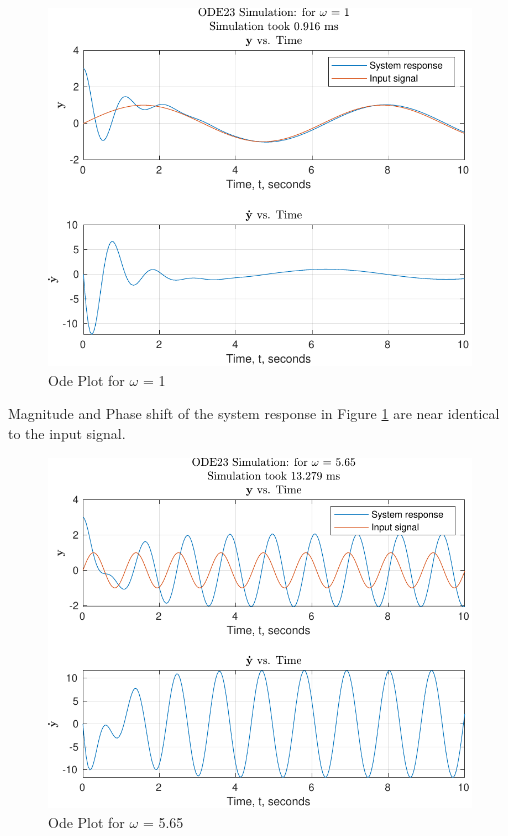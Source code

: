 \documentclass[12pt]{article}
\begin{document}
			
		\begin{figure}[H]
			\centering
			\includegraphics[width=1\linewidth]{Code/Fig/ode_sin_input_1}
			\caption{Ode Plot for $\omega$ = 1}
			\label{fig:odesininput1}
		\end{figure}
		Magnitude and Phase shift of the system response in Figure \ref{fig:odesininput1} are near identical to the input signal.
		\begin{figure}[H]
			\centering
			\includegraphics[width=1\linewidth]{Code/Fig/ode_sin_input_5.65}
			\caption{Ode Plot for $\omega$ = 5.65}
			\label{fig:odesininput5_65}
		\end{figure}
\end{document}
